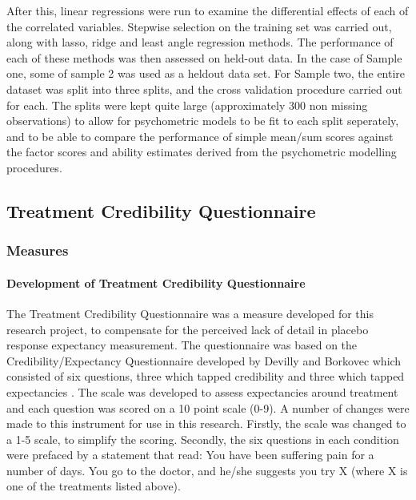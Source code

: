 After this, linear regressions were run to examine the differential effects of each of the correlated variables. Stepwise selection on the training set was carried out, along with lasso, ridge and least angle regression methods. The performance of each of these methods was then assessed on held-out data. In the case of Sample one, some of sample 2 was used as a heldout data set. For Sample two, the entire dataset was split into three splits, and the cross validation procedure carried out for each. The splits were kept quite large (approximately 300 non missing observations) to allow for psychometric models to be fit to each split seperately, and to be able to compare the performance of simple mean/sum scores against the factor scores and ability estimates derived from the psychometric modelling procedures.   %


\subsection{Treatment Credibility Questionnaire}

\subsubsection{Measures}

\paragraph{Development of Treatment Credibility Questionnaire}

The Treatment Credibility Questionnaire was a measure developed for this research project, to compensate for the perceived lack of detail in placebo response expectancy measurement. The questionnaire was based on the Credibility/Expectancy Questionnaire developed by Devilly and Borkovec which consisted of six questions, three which tapped credibility and three which tapped expectancies \cite{Devilly2000}. The scale was developed to assess expectancies around treatment and each question was scored on a 10 point scale (0-9). A number of changes were made to this instrument for use in this research. Firstly, the scale was changed to a 1-5 scale, to simplify the scoring. Secondly, the six questions in each condition were prefaced by a statement that read: You have been suffering pain for a number of days. You go to the doctor, and he/she suggests you try X (where X is one of the treatments listed above).

